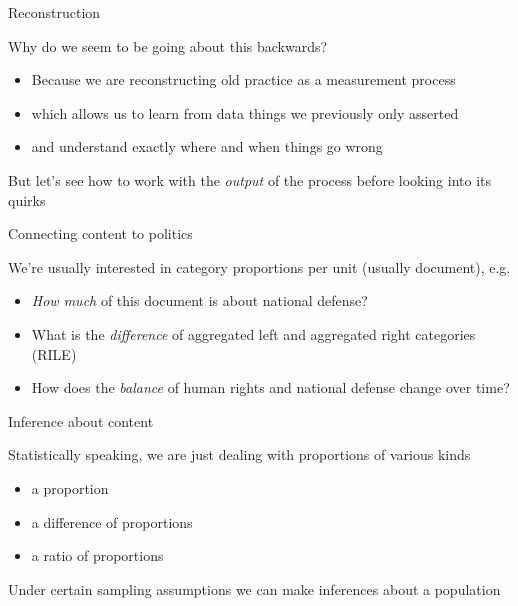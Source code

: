 \documentclass{hertieteaching}
\begin{document}
\begin{frame}{Reconstruction}

Why do we seem to be going about this backwards?
\begin{itemize}
  \item Because we are reconstructing old practice as a measurement process
  \item which allows us to learn from data things we previously only asserted
  \item and understand exactly where and when things go wrong
\end{itemize}

But let's see how to work with the \textit{output} of the process before looking into its quirks

\end{frame}

\begin{frame}{Connecting content to politics}

We're usually interested in category proportions per unit (usually
document), e.g.

\begin{itemize}
\item
  \emph{How much} of this document is about national defense?\item
  What is the \emph{difference} of aggregated left and aggregated right
  categories (RILE)\item
  How does the \emph{balance} of human rights and national defense
  change over time?
\end{itemize}

\end{frame}

\begin{frame}{Inference about content}
\protect\hypertarget{inference-about-content}{}

Statistically speaking, we are just dealing with proportions of various
kinds

\begin{itemize}
\item
  a proportion\item
  a difference of proportions\item
  a ratio of proportions
\end{itemize}

Under certain sampling assumptions we can make inferences about a
population

\end{frame}
\end{document}
